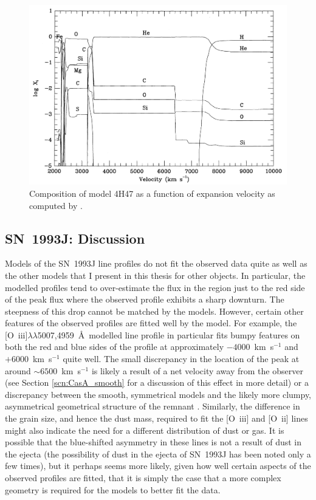 \begin{figure}
\centering
\includegraphics[scale=0.4,clip=true, trim=30 0 0 0]{chapters/chapter6/figs/93J/explosion_model.png}
\caption{Composition of model 4H47 as a function of expansion velocity as computed by \citet{Nomoto1993}.}
\label{4h47}
\end{figure}

\subsection{SN~1993J:  Discussion}
\label{scn:discuss93j}
Models of the SN~1993J line profiles do not fit the observed data quite as well as the other models that I present in this thesis for other objects.  In particular, the modelled profiles tend to over-estimate the flux in the region just to the red side of the peak flux where the observed profile exhibits a sharp downturn.  The steepness of this drop cannot be matched by the models.  However, certain other features of the observed profiles are fitted well by the model.  For example, the [O~{\sc iii}]$\lambda\lambda$5007,4959~\AA\  modelled line profile in particular fits bumpy features on both the red and blue sides of the profile at approximately $-4000$~km~s$^{-1}$ and $+6000$~km~s$^{-1}$ quite well.  The small discrepancy in the location of the peak at around $\sim6500$~km~s$^{-1}$ is likely a result of a net velocity away from the observer (see Section \ref{scn:CasA_smooth} for a discussion of this effect in more detail) or a discrepancy between the smooth, symmetrical models and the likely more clumpy, asymmetrical geometrical structure of the remnant \citep{Tran1997}.  Similarly, the difference in the grain size, and hence the dust mass, required to fit the [O~{\sc iii}] and [O~{\sc ii}] lines might also indicate the need for a different distribution of dust or gas.  It is possible that the blue-shifted asymmetry in these lines is not a result of dust in the ejecta (the possibility of dust in the ejecta of SN~1993J has been noted only a few times), but it perhaps seems more likely, given how well certain aspects of the observed profiles are fitted, that it is simply the case that a more complex geometry is required for the models to better fit the data.

